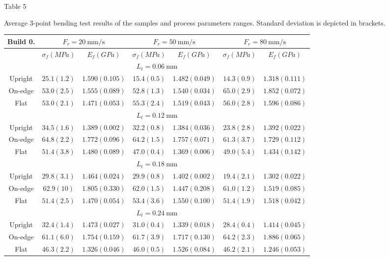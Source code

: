 \documentclass[10pt]{article}
\begin{document}
Table 5

Average 3-point bending test results of the samples and process parameters ranges. Standard deviation is depicted in brackets.

\begin{center}
\begin{tabular}{|c|c|c|c|c|c|c|}
\hline
\multirow[b]{2}{*}{Build 0.} & \multicolumn{2}{|c|}{$F_{r}=20 \mathrm{~mm} / \mathrm{s}$} & \multicolumn{2}{|c|}{$F_{r}=50 \mathrm{~mm} / \mathrm{s}$} & \multicolumn{2}{|c|}{$F_{r}=80 \mathrm{~mm} / \mathrm{s}$} \\
\hline
 & $\sigma_{f}(M P a)$ & $E_{f}(G P a)$ & $\sigma_{f}(M P a)$ & $E_{f}(G P a)$ & $\sigma_{f}(M P a)$ & $E_{f}(G P a)$ \\
\hline
\multicolumn{7}{|c|}{$L_{t}=0.06 \mathrm{~mm}$} \\
\hline
Upright & $25.1(1.2)$ & $1.590(0.105)$ & $15.4(0.5)$ & $1.482(0.049)$ & $14.3(0.9)$ & $1.318(0.111)$ \\
\hline
On-edge & $53.0(2.5)$ & $1.555(0.089)$ & $52.8(1.3)$ & $1.540(0.034)$ & $65.0(2.9)$ & $1.852(0.072)$ \\
\hline
Flat & $53.0(2.1)$ & $1.471(0.053)$ & $55.3(2.4)$ & $1.519(0.043)$ & $56.0(2.8)$ & $1.596(0.086)$ \\
\hline
\multicolumn{7}{|c|}{$L_{t}=0.12 \mathrm{~mm}$} \\
\hline
Upright & $34.5(1.6)$ & $1.389(0.002)$ & $32.2(0.8)$ & $1.384(0.036)$ & $23.8(2.8)$ & $1.392(0.022)$ \\
\hline
On-edge & $64.8(2.2)$ & $1.772(0.096)$ & $64.2(1.5)$ & $1.757(0.071)$ & $61.3(3.7)$ & $1.729(0.112)$ \\
\hline
Flat & $51.4(3.8)$ & $1.480(0.089)$ & $47.0(0.4)$ & $1.369(0.006)$ & $49.0(5.4)$ & $1.434(0.142)$ \\
\hline
\multicolumn{7}{|c|}{$L_{t}=0.18 \mathrm{~mm}$} \\
\hline
Upright & $29.8(3.1)$ & $1.464(0.024)$ & $29.9(0.8)$ & $1.402(0.002)$ & $19.4(2.1)$ & $1.302(0.022)$ \\
\hline
On-edge & $62.9(10)$ & $1.805(0.330)$ & $62.0(1.5)$ & $1.447(0.208)$ & $61.0(1.2)$ & $1.519(0.085)$ \\
\hline
Flat & $51.4(2.5)$ & $1.470(0.054)$ & $53.4(3.6)$ & $1.550(0.100)$ & $51.4(1.9)$ & $1.518(0.042)$ \\
\hline
\multicolumn{7}{|c|}{$L_{t}=0.24 \mathrm{~mm}$} \\
\hline
Upright & $32.4(1.4)$ & $1.473(0.027)$ & $31.0(0.4)$ & $1.339(0.018)$ & $28.4(0.4)$ & $1.414(0.045)$ \\
\hline
On-edge & $61.1(6.0)$ & $1.754(0.159)$ & $61.7(3.9)$ & $1.717(0.130)$ & $64.2(2.3)$ & $1.886(0.065)$ \\
\hline
Flat & $46.3(2.2)$ & $1.326(0.046)$ & $46.0(0.5)$ & $1.526(0.084)$ & $46.2(2.1)$ & $1.246(0.053)$ \\
\hline
\end{tabular}
\end{center}
\end{document}
